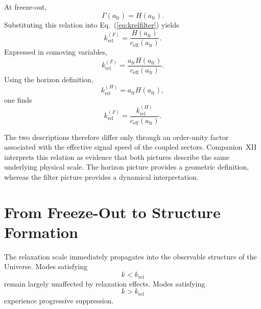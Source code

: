 \documentclass[11pt,a4paper]{article}
\begin{document}
At freeze-out,
\begin{equation}
  \Gamma(a_{\mathrm{fr}})
  =
  H(a_{\mathrm{fr}}).
\end{equation}
Substituting this relation into Eq.~(\ref{eq:krelfilter}) yields
\begin{equation}
  k_{\mathrm{rel}}^{(F)}
  =
  \frac{H(a_{\mathrm{fr}})}{c_{\mathrm{eff}}(a_{\mathrm{fr}})}.
\end{equation}
Expressed in comoving variables,
\begin{equation}
  k_{\mathrm{rel}}^{(F)}
  =
  \frac{a_{\mathrm{fr}} H(a_{\mathrm{fr}})}{c_{\mathrm{eff}}(a_{\mathrm{fr}})}.
\end{equation}
Using the horizon definition,
\begin{equation}
  k_{\mathrm{rel}}^{(H)}
  =
  a_{\mathrm{fr}} H(a_{\mathrm{fr}}),
\end{equation}
one finds
\begin{equation}
  k_{\mathrm{rel}}^{(F)}
  =
  \frac{k_{\mathrm{rel}}^{(H)}}{c_{\mathrm{eff}}(a_{\mathrm{fr}})}.
  \label{eq:consistency}
\end{equation}

The two descriptions therefore differ only through an order-unity factor
associated with the effective signal speed of the coupled sectors.
Companion~XII interprets this relation as evidence that both pictures describe
the same underlying physical scale. The horizon picture provides a geometric
definition, whereas the filter picture provides a dynamical interpretation.

\section{From Freeze-Out to Structure Formation}

The relaxation scale immediately propagates into the observable structure of
the Universe. Modes satisfying
\begin{equation}
  k < k_{\mathrm{rel}}
\end{equation}
remain largely unaffected by relaxation effects. Modes satisfying
\begin{equation}
  k > k_{\mathrm{rel}}
\end{equation}
experience progressive suppression.
\end{document}
